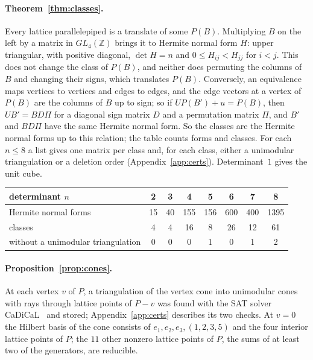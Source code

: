 \documentclass[11pt]{article}
\theoremstyle{definition}
\newcommand{\Z}{\mathbb{Z}}
\begin{document}
\paragraph{Theorem~\ref{thm:classes}.}
Every lattice parallelepiped is a translate of some $P(B)$. Multiplying $B$
on the left by a matrix in $GL_4(\Z)$ brings it to Hermite normal form $H$:
upper triangular, with positive diagonal, $\det H=n$ and
$0\le H_{ij}<H_{jj}$ for $i<j$. This does not change the class of $P(B)$,
and neither does permuting the columns of $B$ and changing their signs,
which translates $P(B)$. Conversely, an equivalence maps vertices to
vertices and edges to edges, and the edge vectors at a vertex of $P(B)$ are
the columns of $B$ up to sign; so if $UP(B')+u=P(B)$, then $UB'=BD\Pi$ for
a diagonal sign matrix $D$ and a permutation matrix $\Pi$, and $B'$ and
$BD\Pi$ have the same Hermite normal form. So the classes are the Hermite
normal forms up to this relation; the table counts forms and classes. For
each $n\le 8$ a list gives one matrix per class and, for each class, either
a unimodular triangulation or a deletion order (Appendix~\ref{app:certs}).
Determinant~$1$ gives the unit cube.

\begin{center}
\begin{tabular}{lccccccc}
\toprule
determinant $n$ & 2 & 3 & 4 & 5 & 6 & 7 & 8\\
\midrule
Hermite normal forms & 15 & 40 & 155 & 156 & 600 & 400 & 1395\\
classes & 4 & 4 & 16 & 8 & 26 & 12 & 61\\
without a unimodular triangulation & 0 & 0 & 0 & 1 & 0 & 1 & 2\\
\bottomrule
\end{tabular}
\end{center}

\paragraph{Proposition~\ref{prop:cones}.}
At each vertex $v$ of $P$, a triangulation of the vertex cone into
unimodular cones with rays through lattice points of $P-v$ was found with
the SAT solver CaDiCaL~\cite{CaDiCaL} and stored;
Appendix~\ref{app:certs} describes its two checks. At $v=0$ the
Hilbert basis of the cone consists of $e_1,e_2,e_3,(1,2,3,5)$ and the four
interior lattice points of $P$; the $11$ other nonzero lattice points of
$P$, the sums of at least two of the generators, are reducible.
\end{document}

